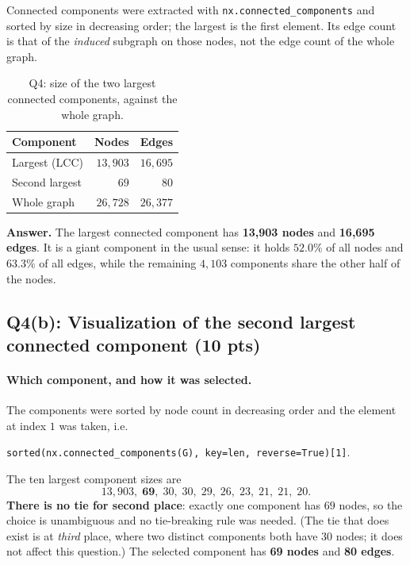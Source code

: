 Connected components were extracted with
\texttt{nx.connected\_components} and sorted by size in decreasing order; the
largest is the first element. Its edge count is that of the \emph{induced}
subgraph on those nodes, not the edge count of the whole graph.

\begin{table}[ht]
  \centering
  \begin{tabular}{lrr}
    \toprule
    Component & Nodes & Edges \\
    \midrule
    Largest (LCC)        & $13{,}903$ & $16{,}695$ \\
    Second largest       & $69$       & $80$       \\
    \midrule
    Whole graph          & $26{,}728$ & $26{,}377$ \\
    \bottomrule
  \end{tabular}
  \caption{Q4: size of the two largest connected components, against the whole
  graph.}
  \label{p2:tab:q4}
\end{table}

\noindent\textbf{Answer.} The largest connected component has
\textbf{13{,}903 nodes} and \textbf{16{,}695 edges}. It is a giant component in
the usual sense: it holds $52.0\%$ of all nodes and $63.3\%$ of all edges, while
the remaining $4{,}103$ components share the other half of the nodes.

\subsection*{Q4(b): Visualization of the second largest connected component (10 pts)}

\paragraph{Which component, and how it was selected.}
The components were sorted by node count in decreasing order and the element at
index $1$ was taken, i.e.
\begin{center}
\texttt{sorted(nx.connected\_components(G), key=len, reverse=True)[1]}.
\end{center}
The ten largest component sizes are
\[
  13{,}903,\; \mathbf{69},\; 30,\; 30,\; 29,\; 26,\; 23,\; 21,\; 21,\; 20 .
\]
\textbf{There is no tie for second place}: exactly one component has $69$ nodes,
so the choice is unambiguous and no tie-breaking rule was needed. (The tie that
does exist is at \emph{third} place, where two distinct components both have
$30$ nodes; it does not affect this question.) The selected component has
\textbf{69 nodes} and \textbf{80 edges}.

